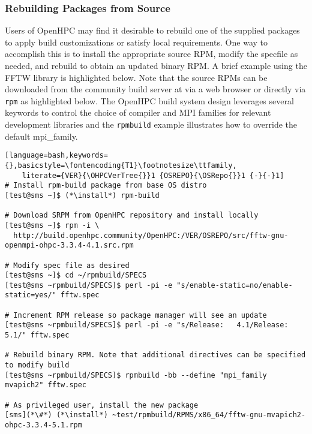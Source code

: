 \subsubsection{Rebuilding Packages from Source}  \label{appendix:rpmbuild}

Users of OpenHPC may find it desirable to rebuild one of the supplied packages
to apply build customizations or satisfy local requirements. One way to
accomplish this is to install the appropriate source RPM, modify the specfile
as needed, and rebuild to obtain an updated binary RPM. A brief example using
the FFTW library is highlighted below.  Note that the source RPMs can be downloaded from the
community build server at \href{https://build.openhpc.community}
{\color{blue}{https://build.openhpc.community}} via a web browser or directly
via \texttt{rpm} as highlighted below. The OpenHPC build system design
leverages several keywords to control the choice of compiler and MPI families
for relevant development libraries and the \texttt{rpmbuild} example
illustrates how to override the default mpi\_family.

\begin{lstlisting}[language=bash,keywords={},basicstyle=\fontencoding{T1}\footnotesize\ttfamily,
    literate={VER}{\OHPCVerTree{}}1 {OSREPO}{\OSRepo{}}1 {-}{-}1]
# Install rpm-build package from base OS distro
[test@sms ~]$ (*\install*) rpm-build

# Download SRPM from OpenHPC repository and install locally
[test@sms ~]$ rpm -i \
  http://build.openhpc.community/OpenHPC:/VER/OSREPO/src/fftw-gnu-openmpi-ohpc-3.3.4-4.1.src.rpm

# Modify spec file as desired
[test@sms ~]$ cd ~/rpmbuild/SPECS
[test@sms ~rpmbuild/SPECS]$ perl -pi -e "s/enable-static=no/enable-static=yes/" fftw.spec

# Increment RPM release so package manager will see an update
[test@sms ~rpmbuild/SPECS]$ perl -pi -e "s/Release:   4.1/Release:   5.1/" fftw.spec

# Rebuild binary RPM. Note that additional directives can be specified to modify build
[test@sms ~rpmbuild/SPECS]$ rpmbuild -bb --define "mpi_family mvapich2" fftw.spec

# As privileged user, install the new package
[sms](*\#*) (*\install*) ~test/rpmbuild/RPMS/x86_64/fftw-gnu-mvapich2-ohpc-3.3.4-5.1.rpm
\end{lstlisting}
